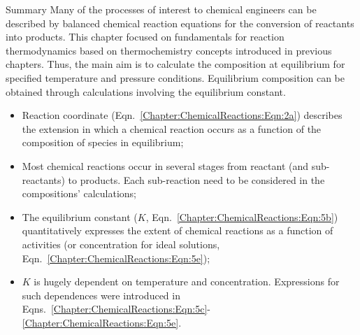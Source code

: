 \clearpage   
\begin{FinalSummaryBlock}{Summary}
  Many of the processes of interest to chemical engineers can be described by balanced chemical reaction equations for the conversion of reactants into products. This chapter focused on fundamentals for reaction thermodynamics based on thermochemistry concepts introduced in previous chapters. Thus, the main aim is to calculate the composition at equilibrium for specified temperature and pressure conditions. Equilibrium composition can be obtained through calculations involving the equilibrium constant.  
    \begin{itemize}
       \item Reaction coordinate (Eqn.~\ref{Chapter:ChemicalReactions:Eqn:2a}) describes the extension in which a chemical reaction occurs as a function of the composition of species in equilibrium;
       \item Most chemical reactions occur in several stages from reactant (and sub-reactants) to products. Each sub-reaction need to be considered in the compositions' calculations;
       \item The equilibrium constant ($K$, Eqn.~\ref{Chapter:ChemicalReactions:Eqn:5b}) quantitatively expresses the extent of chemical reactions as a function of activities (or concentration for ideal solutions, Eqn.~\ref{Chapter:ChemicalReactions:Eqn:5e});
       \item $K$ is hugely dependent on temperature and concentration. Expressions for such dependences were introduced in Eqns.~\ref{Chapter:ChemicalReactions:Eqn:5c}-\ref{Chapter:ChemicalReactions:Eqn:5e}.
    \end{itemize}
\end{FinalSummaryBlock}
